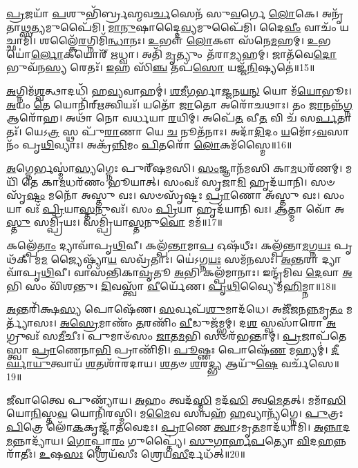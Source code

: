 \-\ul{𑌪𑍍𑌰}\-𑌜𑌯𑌾᳴ \ul{𑌪}\-𑌶𑍁𑌭𑌿᳴𑌰𑍍𑌬𑍍𑌰𑌹𑍍𑌮𑌵\-\ul{𑌰𑍍𑌚}\-𑌸𑍇𑌨᳴ 𑌸𑍁\-\ul{𑌵}\-𑌰𑍍𑌗𑍇 \ul{𑌲𑍋}\-𑌕𑍇।
𑌅𑌨𑍃᳴𑌤𑌾\-\ul{𑌥𑍍𑌸}\-𑌤𑍍𑌯\-𑌮𑍁𑌪𑍈᳴𑌮𑌿।
\-\ul{𑌮𑌾}\-\-\ul{𑌨𑍁}\-𑌷𑌾𑌦𑍍𑌦𑍈\-\ul{𑌵𑍍𑌯}\-𑌮𑍁𑌪𑍈᳴𑌮𑌿।
𑌦𑍈\-\ul{𑌵𑍀𑌂} 𑌵𑌾𑌚𑌂᳴ 𑌯𑌚𑍍𑌛𑌾𑌮𑌿।
𑌶𑌲𑍍𑌕𑍈᳴\-\ul{𑌰}\-𑌗𑍍𑌨𑌿𑌮𑌿᳴\-\ul{𑌨𑍍𑌧𑌾}\-𑌨𑌃।
\-\ul{𑌉}\-𑌭𑍗 \ul{𑌲𑍋}\-𑌕𑍗 𑌸᳴𑌨𑍇\-\ul{𑌮}\-𑌹𑌮𑍍।
\-\ul{𑌉}\-𑌭𑌯𑍋॑\-\ul{𑌰𑍍𑌲𑍋}\-𑌕𑌯𑍋𑌰𑍍᳴ \ul{𑌋}\-𑌧𑍍𑌵𑌾।
𑌅𑌤𑌿᳴ \ul{𑌮𑍃}\-𑌤𑍍𑌯𑍁𑌂 𑌤᳴𑌰𑌾\-\ul{𑌮𑍍𑌯}\-𑌹𑌮𑍍।
𑌜𑌾𑌤᳴𑌵𑍇\-\ul{𑌦𑍋} 𑌭𑍁𑌵᳴𑌨\-\ul{𑌸𑍍𑌯} 𑌰𑍇𑌤𑌃᳴।
\-\ul{𑌇}\-𑌹 𑌸𑌿᳴\-\ul{𑌞𑍍𑌚} 𑌤𑌪᳴\-\ul{𑌸𑍋} 𑌯𑌜𑍍𑌜᳴\-\ul{𑌨𑌿}\-𑌷𑍍𑌯𑌤𑍇॑॥15॥

\-\ul{𑌅}\-𑌗𑍍𑌨𑌿𑌮᳴\-\ul{𑌶𑍍𑌵}\-𑌤𑍍𑌥𑌾𑌦𑌧𑌿᳴ 𑌹\-\ul{𑌵𑍍𑌯}\-𑌵𑌾𑌹𑌮𑍍॑।
\-\ul{𑌶}\-\-\ul{𑌮𑍀}\-\-\ul{𑌗}\-𑌰𑍍𑌭𑌾\-\ul{𑌜𑍍𑌜}\-𑌨\-\ul{𑌯}\-\-\ul{𑌨𑍍} 𑌯𑍋 𑌮᳴\-\ul{𑌯𑍋}\-𑌭𑍂𑌃।
\-\ul{𑌅}\-𑌯𑌂 \ul{𑌤𑍇} 𑌯𑍋𑌨𑌿᳴𑌰𑍍‌\mbox{}\-\ul{𑌋}\-𑌤𑍍𑌵𑌿𑌯𑌃᳴।
𑌯𑌤𑍋᳴ \ul{𑌜𑌾}\-𑌤𑍋 𑌅𑌰𑍋᳴𑌚𑌥𑌾𑌃।
𑌤𑌂 \ul{𑌜𑌾}\-𑌨𑌨𑍍𑌨᳴\-\ul{𑌗𑍍𑌨} 𑌆𑌰𑍋᳴𑌹।
𑌅𑌥𑌾᳴ 𑌨𑍋 𑌵𑌰𑍍𑌧𑌯𑌾 \ul{𑌰}\-𑌯𑌿𑌮𑍍।
𑌅𑌪𑍇᳴\-\ul{𑌤} 𑌵𑍀\-\ul{𑌤} 𑌵𑌿 𑌚᳴ 𑌸\-\ul{𑌰𑍍𑌪}\-𑌤𑌾𑌤𑌃᳴।
𑌯𑍇𑌽\-\ul{𑌤𑍍𑌰} 𑌸𑍍𑌥 𑌪𑍁᳴\-\ul{𑌰𑌾}\-𑌣𑌾 𑌯𑍇 \ul{𑌚} 𑌨𑍂𑌤᳴𑌨𑌾𑌃।
𑌅𑌦𑌾᳴\-\ul{𑌦𑌿}\-𑌦𑌂 \ul{𑌯}\-𑌮𑍋᳴\-𑌽\-\ul{𑌵}\-𑌸𑌾𑌨𑌂᳴ 𑌪𑍃\-\ul{𑌥𑌿}\-𑌵𑍍𑌯𑌾𑌃।
𑌅𑌕𑍍𑌰᳴\-\ul{𑌨𑍍𑌨𑌿}\-𑌮𑌂 \ul{𑌪𑌿}\-𑌤𑌰𑍋᳴ \ul{𑌲𑍋}\-𑌕𑌮᳴𑌸𑍍𑌮𑍈॥16॥

\-\ul{𑌅}\-𑌗𑍍𑌨𑍇𑌰𑍍𑌭𑌸𑍍𑌮𑌾॑\-\ul{𑌸𑍍𑌯}\-𑌗𑍍𑌨𑍇𑌃 𑌪𑍁𑌰𑍀᳴𑌷𑌮𑌸𑌿।
\-\ul{𑌸𑌂}\-𑌜𑍍𑌞𑌾𑌨᳴𑌮𑌸𑌿 𑌕𑌾\-\ul{𑌮}\-𑌧𑌰᳴𑌣𑌮𑍍।
𑌮𑌯𑌿᳴ 𑌤𑍇 𑌕𑌾\-\ul{𑌮}\-𑌧𑌰᳴𑌣𑌂 𑌭𑍂𑌯𑌾𑌤𑍍।
𑌸𑌂𑌵𑌃᳴ 𑌸𑍃𑌜𑌾\-\ul{𑌮𑌿} 𑌹𑍃𑌦᳴𑌯𑌾𑌨𑌿।
𑌸𑍞𑌸𑍃᳴\-\ul{𑌷𑍍𑌟𑌂} 𑌮𑌨𑍋᳴ 𑌅𑌸𑍍𑌤𑍁 𑌵𑌃।
𑌸𑍞𑌸𑍃᳴𑌷𑍍𑌟𑌃 \ul{𑌪𑍍𑌰𑌾}\-𑌣𑍋 𑌅᳴𑌸𑍍𑌤𑍁 𑌵𑌃।
𑌸𑌂 𑌯𑌾 𑌵𑌃᳴ \ul{𑌪𑍍𑌰𑌿}\-𑌯𑌾\-\ul{𑌸𑍍𑌤}\-𑌨𑍁𑌵𑌃᳴।
𑌸𑌂 \ul{𑌪𑍍𑌰𑌿}\-𑌯𑌾 𑌹𑍃𑌦᳴𑌯𑌾𑌨𑌿 𑌵𑌃।
\-\ul{𑌆}\-𑌤𑍍𑌮𑌾 𑌵𑍋᳴ 𑌅\-\ul{𑌸𑍍𑌤𑍁} 𑌸𑌮𑍍𑌪𑍍𑌰𑌿᳴𑌯𑌃।
𑌸𑌮𑍍𑌪𑍍𑌰𑌿᳴𑌯𑌾\-\ul{𑌸𑍍𑌤}\-𑌨𑍁\-\ul{𑌵𑍋} 𑌮𑌮᳴॥17॥

𑌕𑌲𑍍𑌪𑍇᳴\-\ul{𑌤𑌾𑌂} 𑌦𑍍𑌯𑌾𑌵𑌾᳴𑌪𑍃\-\ul{𑌥𑌿}\-𑌵𑍀।
𑌕𑌲𑍍𑌪᳴\-\ul{𑌨𑍍𑌤𑌾}\-𑌮𑌾\-\ul{𑌪} 𑌓𑌷᳴𑌧𑍀𑌃।
𑌕𑌲𑍍𑌪᳴𑌨𑍍𑌤𑌾\-\ul{𑌮}\-𑌗𑍍𑌨\-\ul{𑌯𑌃} 𑌪𑍃𑌥᳴𑌕𑍍।
𑌮\-\ul{𑌮} 𑌜𑍍𑌯𑍈𑌷𑍍𑌠𑍍𑌯𑌾᳴\-\ul{𑌯} 𑌸𑌵𑍍𑌰᳴𑌤𑌾𑌃।
𑌯𑍇॑𑌽𑌗𑍍𑌨\-\ul{𑌯𑌃} 𑌸𑌮᳴𑌨𑌸𑌃।
\-\ul{𑌅}\-\-\ul{𑌨𑍍𑌤}\-𑌰𑌾 𑌦𑍍𑌯𑌾𑌵𑌾᳴𑌪𑍃\-\ul{𑌥𑌿}\-𑌵𑍀।
𑌵𑌾𑌸᳴𑌨𑍍𑌤𑌿𑌕𑌾\-\ul{𑌵𑍃}\-𑌤𑍂 \ul{𑌅}\-𑌭𑌿 𑌕𑌲𑍍𑌪᳴𑌮𑌾𑌨𑌾𑌃।
𑌇𑌨𑍍𑌦𑍍𑌰᳴𑌮𑌿𑌵 \ul{𑌦𑍇}\-𑌵𑌾 \ul{𑌅}\-𑌭𑌿 𑌸𑌂 𑌵𑌿᳴𑌶𑌨𑍍𑌤𑍁।
\-\ul{𑌦𑌿}\-𑌵𑌸𑍍𑌤𑍍𑌵𑌾᳴ \ul{𑌵𑍀}\-𑌰𑍍𑌯𑍇᳴𑌣।
\-\ul{𑌪𑍃}\-\-\ul{𑌥𑌿}\-𑌵𑍍𑌯𑍈 𑌮᳴\-\ul{𑌹𑌿}\-𑌮𑍍𑌨𑌾॥18॥

\-\ul{𑌅}\-𑌨𑍍𑌤𑌰𑌿᳴𑌕𑍍𑌷\-\ul{𑌸𑍍𑌯} 𑌪𑍋𑌷𑍇᳴𑌣।
\-\ul{𑌸}\-𑌰𑍍𑌵𑌪᳴\-\ul{𑌶𑍁}\-𑌮𑌾𑌦᳴𑌧𑍇।
𑌅𑌜𑍀᳴𑌜𑌨\-\ul{𑌨𑍍𑌨}\-𑌮𑍃\-\ul{𑌤𑌂} 𑌮𑌰𑍍𑌤𑍍𑌯𑌾᳴𑌸𑌃।
\-\ul{𑌅}\-\-\ul{𑌸𑍍𑌰𑍇}\-𑌮𑌾𑌣𑌂᳴ \ul{𑌤}\-𑌰𑌣𑌿𑌂᳴ \ul{𑌵𑍀}\-𑌡𑍁𑌜᳴𑌮𑍍𑌭𑌮𑍍।
𑌦\-\ul{𑌶} 𑌸𑍍𑌵𑌸𑌾᳴𑌰𑍋 \ul{𑌅}\-𑌗𑍍𑌰𑍁𑌵𑌃᳴ 𑌸\-\ul{𑌮𑍀}\-𑌚𑍀𑌃।
𑌪𑍁𑌮𑌾𑍞᳴𑌸𑌂 \ul{𑌜𑌾}\-𑌤\-\ul{𑌮}\-𑌭𑌿 𑌸𑍞𑌰᳴𑌭𑌨𑍍𑌤𑌾𑌮𑍍।
\-\ul{𑌪𑍍𑌰}\-𑌜𑌾𑌪᳴𑌤𑍇𑌸𑍍𑌤𑍍𑌵𑌾 \ul{𑌪𑍍𑌰𑌾}\-𑌣𑍇𑌨𑌾\-\ul{𑌭𑌿} 𑌪𑍍𑌰𑌾𑌣𑌿᳴𑌮𑌿।
\-\ul{𑌪𑍂}\-𑌷𑍍𑌣𑌃 𑌪𑍋𑌷𑍇᳴\-\ul{𑌣} 𑌮𑌹𑍍𑌯𑌮𑍍॑।
\-\ul{𑌦𑍀}\-\-\ul{𑌰𑍍𑌘𑌾}\-\-\ul{𑌯𑍁}\-𑌤𑍍𑌵𑌾𑌯᳴ \ul{𑌶}\-𑌤𑌶𑌾᳴𑌰𑌦𑌾𑌯।
\-\ul{𑌶}\-𑌤𑍞 \ul{𑌶}\-𑌰\-\ul{𑌦𑍍𑌭𑍍𑌯} 𑌆𑌯𑍁᳴\-\ul{𑌷𑍇} 𑌵𑌰𑍍𑌚᳴𑌸𑍇॥19॥

\-\ul{𑌜𑍀}\-𑌵𑌾𑌤𑍍𑌵𑍈 𑌪𑍁𑌣𑍍𑌯𑌾᳴𑌯।
\-\ul{𑌅}\-𑌹𑌂 𑌤𑍍𑌵𑌦᳴\-\ul{𑌸𑍍𑌮𑌿} 𑌮𑌦᳴\-\ul{𑌸𑌿} 𑌤𑍍𑌵\-\ul{𑌮𑍇}\-𑌤𑌤𑍍।
𑌮𑌮𑌾᳴\-\ul{𑌸𑌿} 𑌯𑍋\-\ul{𑌨𑌿}\-𑌸𑍍𑌤\-\ul{𑌵} 𑌯𑍋𑌨𑌿᳴𑌰𑌸𑍍𑌮𑌿।
𑌮\-\ul{𑌮𑍈}\-𑌵 𑌸𑌨𑍍𑌵𑌹᳴ \ul{𑌹}\-𑌵𑍍𑌯𑌾𑌨𑍍𑌯᳴𑌗𑍍𑌨𑍇।
\-\ul{𑌪𑍁}\-𑌤𑍍𑌰𑌃 \ul{𑌪𑌿}\-𑌤𑍍𑌰𑍇 𑌲𑍋᳴\-\ul{𑌕}\-𑌕𑍃𑌜𑍍𑌜𑌾᳴𑌤𑌵𑍇𑌦𑌃।
\-\ul{𑌪𑍍𑌰𑌾}\-𑌣𑍇 \ul{𑌤𑍍𑌵𑌾}\-\-𑌽𑌮𑍃\-\ul{𑌤}\-𑌮𑌾𑌦᳴𑌧𑌾𑌮𑌿।
\-\ul{𑌅}\-\-\ul{𑌨𑍍𑌨𑌾}\-𑌦\-\ul{𑌮}\-𑌨𑍍𑌨𑌾𑌦𑍍𑌯𑌾᳴𑌯।
\-\ul{𑌗𑍋}\-𑌪𑍍𑌤𑌾\-\ul{𑌰𑌂} 𑌗𑍁𑌪𑍍𑌤𑍍𑌯𑍈॑।
\-\ul{𑌸𑍁}\-\-\ul{𑌗𑌾}\-\-\ul{𑌰𑍍}\-\-\ul{𑌹}\-\-\ul{𑌪}\-𑌤𑍍𑌯𑍋 \ul{𑌵𑌿}\-𑌦\-\ul{𑌹}\-𑌨𑍍𑌨𑌰𑌾᳴𑌤𑍀𑌃।
\-\ul{𑌉}\-𑌷\-\ul{𑌸𑌃} 𑌶𑍍𑌰𑍇𑌯᳴𑌸𑍀𑌃 𑌶𑍍𑌰𑍇𑌯\-\ul{𑌸𑍀}\-𑌰𑍍𑌦𑌧᳴𑌤𑍍॥20॥

